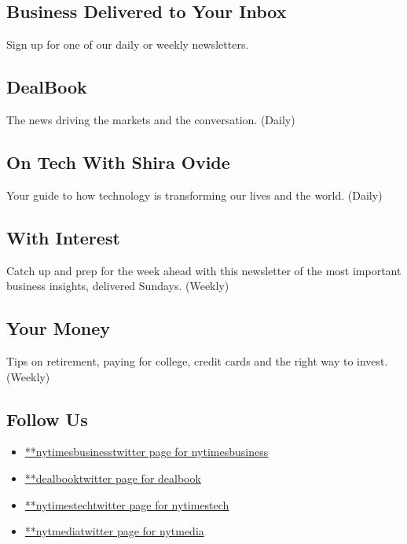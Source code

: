 \hypertarget{business-delivered-to-your-inbox}{%
\subsection{Business Delivered to Your
Inbox}\label{business-delivered-to-your-inbox}}

Sign up for one of our daily or weekly newsletters.

\hypertarget{dealbook}{%
\subsection{DealBook}\label{dealbook}}

The news driving the markets and the conversation. (Daily)

\hypertarget{on-tech-with-shira-ovide}{%
\subsection{On Tech With Shira Ovide}\label{on-tech-with-shira-ovide}}

Your guide to how technology is transforming our lives and the world.
(Daily)

\hypertarget{with-interest}{%
\subsection{With Interest}\label{with-interest}}

Catch up and prep for the week ahead with this newsletter of the most
important business insights, delivered Sundays. (Weekly)

\hypertarget{your-money}{%
\subsection{Your Money}\label{your-money}}

Tips on retirement, paying for college, credit cards and the right way
to invest. (Weekly)

\hypertarget{follow-us}{%
\subsection{Follow Us}\label{follow-us}}

\begin{itemize}
\tightlist
\item
  \href{https://twitter.com/nytimesbusiness}{**nytimesbusinesstwitter
  page for nytimesbusiness}
\item
  \href{https://twitter.com/dealbook}{**dealbooktwitter page for
  dealbook}
\item
  \href{https://twitter.com/nytimestech}{**nytimestechtwitter page for
  nytimestech}
\item
  \href{https://twitter.com/nytmedia}{**nytmediatwitter page for
  nytmedia}
\end{itemize}

